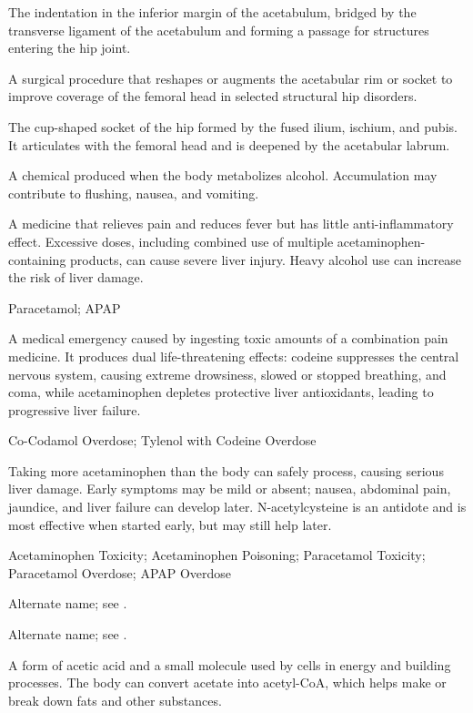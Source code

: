  The indentation in the inferior margin of the acetabulum, bridged by the transverse
ligament of the acetabulum and forming a passage for structures entering the hip joint.

 A surgical procedure that reshapes or augments the acetabular rim or socket to improve
coverage of the femoral head in selected structural hip disorders.

 The cup-shaped socket of the hip formed by the fused ilium, ischium, and pubis. It articulates with the femoral head
and is deepened by the acetabular labrum.

 A chemical produced when the body metabolizes alcohol. Accumulation may contribute to flushing, nausea, and vomiting.

 A medicine that relieves pain and reduces fever but has little anti-inflammatory effect. Excessive doses, including combined use of multiple acetaminophen-containing products, can cause severe liver injury. Heavy alcohol use can increase the risk of liver damage.

\synonyms
Paracetamol; APAP

 A medical emergency caused by ingesting toxic amounts of a combination pain medicine. It produces dual life-threatening effects: codeine suppresses the central nervous system, causing extreme drowsiness, slowed or stopped breathing, and coma, while acetaminophen depletes protective liver antioxidants, leading to progressive liver failure.

\synonyms
Co-Codamol Overdose; Tylenol with Codeine Overdose

 Taking more acetaminophen than the body can safely process, causing serious liver damage. Early symptoms may be mild or absent; nausea, abdominal pain, jaundice, and liver failure can develop later. N-acetylcysteine is an antidote and is most effective when started early, but may still help later.

\synonyms
Acetaminophen Toxicity; Acetaminophen Poisoning; Paracetamol Toxicity; Paracetamol Overdose; APAP Overdose

 Alternate name; see .

 Alternate name; see .

 A form of acetic acid and a small molecule used by cells in energy and building processes. The body can convert acetate into acetyl-CoA, which helps make or break down fats and other substances.

